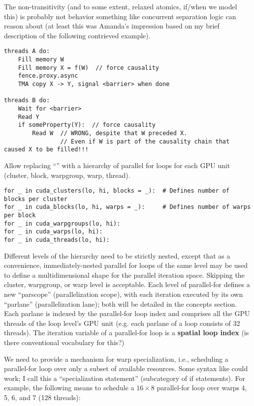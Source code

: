 \filbreak
The non-transitivity (and to some extent, relaxed atomics, if/when we model this) is probably not behavior something like concurrent separation logic can reason about (at least this was Amanda's impression based on my brief description of the following contrieved example).

{
\color{lightttColor}
\begin{verbatim}
threads A do:
    Fill memory W
    Fill memory X = f(W)  // force causality
    fence.proxy.async
    TMA copy X -> Y, signal <barrier> when done

threads B do:
    Wait for <barrier>
    Read Y
    if someProperty(Y):  // force causality
        Read W  // WRONG, despite that W preceded X.
                // Even if W is part of the causality chain that caused X to be filled!!!
\end{verbatim}
}

\newpage
{}

 Allow replacing ``'' with a hierarchy of parallel for loops for each GPU unit (cluster, block, warpgroup, warp, thread).

\filbreak
{\color{lightttColor}
\begin{verbatim}
for _ in cuda_clusters(lo, hi, blocks = _):  # Defines number of blocks per cluster
for _ in cuda_blocks(lo, hi, warps = _):     # Defines number of warps per block
for _ in cuda_warpgroups(lo, hi):
for _ in cuda_warps(lo, hi):
for _ in cuda_threads(lo, hi):
\end{verbatim}
}

\filbreak
Different levels of the hierarchy need to be strictly nested, except that as a convenience, immediately-nested parallel for loops of the same level may be used to define a multidimensional shape for the parallel iteration space.
Skipping the cluster, warpgroup, or warp level is acceptable.
Each level of parallel-for defines a new ``parscope'' (parallelization scope), with each iteration executed by its own ``parlane'' (parallelization lane); both will be detailed in the concepts section.
Each parlane is indexed by the parallel-for loop index and comprises all the GPU threads of the loop level's GPU unit (e.g. each parlane of a  loop consists of 32 threads).
The iteration variable of a parallel-for loop is a \textbf{spatial loop index} (is there conventional vocabulary for this?)

\filbreak
{} We need to provide a mechanism for warp specialization, i.e., scheduling a parallel-for loop over only a subset of available resources.
Some syntax like  could work; I call this a ``specialization statement'' (subcategory of if statements).
For example, the following means to schedule a $16 \times 8$ parallel-for loop over warps 4, 5, 6, and 7 (128 threads):

